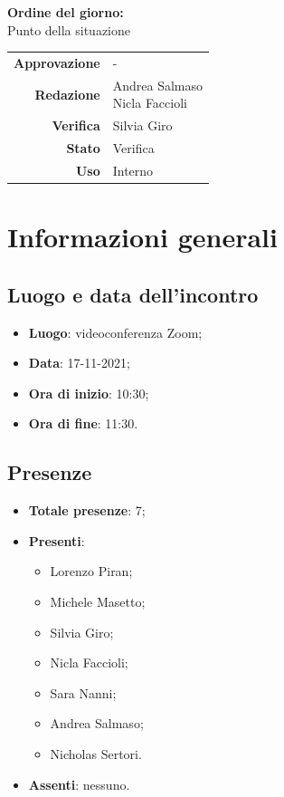 \documentclass[11pt]{article}
\begin{document}
\begin{titlepage}
\begin{center}
			\large
			
			\vfill
			\textbf{Ordine del giorno:} \\
			Punto della situazione
			
			
			\vfill
			
			
			\begin{tabular}{r|l}
				\textbf{Approvazione} &  -\\
				\textbf{Redazione} &  \parbox[t]{3.5cm}{Andrea Salmaso\\ Nicla Faccioli}\\
				\textbf{Verifica} &  Silvia Giro\\
				\textbf{Stato} & Verifica \\
				\textbf{Uso} & Interno
			\end{tabular}
			\vfill
			
		\end{center}
	\end{titlepage}

	\section{Informazioni generali}
	\subsection{Luogo e data dell'incontro}
	\begin{itemize}
		\item \textbf{Luogo}: videoconferenza Zoom;
		\item \textbf{Data}: 17-11-2021;
		\item \textbf{Ora di inizio}: 10:30;
		\item \textbf{Ora di fine}: 11:30.
	\end{itemize}
	
	\subsection{Presenze}
	\begin{itemize}
		\item \textbf{Totale presenze}: 7;
		\item \textbf{Presenti}:
		\begin{itemize}
			\item Lorenzo Piran; 
			\item Michele Masetto;
			\item Silvia Giro;
			\item Nicla Faccioli;
			\item Sara Nanni;
			\item Andrea Salmaso;
			\item Nicholas Sertori.
		\end{itemize}
		\item \textbf{Assenti}: nessuno.
	\end{itemize}
\end{document}
